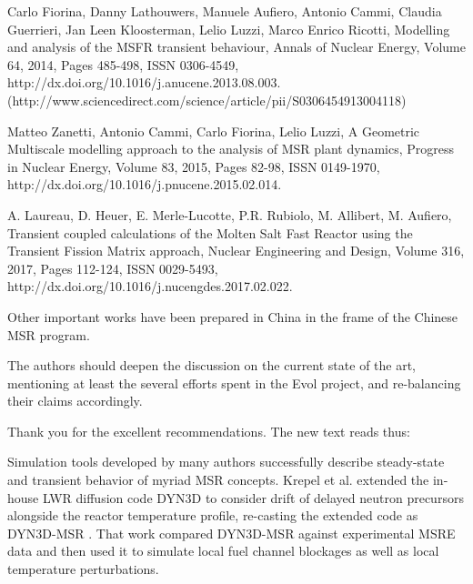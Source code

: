 \documentclass[answers,11pt]{exam}
\begin{document}
\begin{questions}
Carlo Fiorina, Danny Lathouwers, Manuele Aufiero, Antonio Cammi, Claudia
Guerrieri, Jan Leen Kloosterman, Lelio Luzzi, Marco Enrico Ricotti, Modelling
and analysis of the MSFR transient behaviour, Annals of Nuclear Energy, Volume
64, 2014, Pages 485-498, ISSN 0306-4549,
http://dx.doi.org/10.1016/j.anucene.2013.08.003.
(http://www.sciencedirect.com/science/article/pii/S0306454913004118)

Matteo Zanetti, Antonio Cammi, Carlo Fiorina, Lelio Luzzi, A Geometric
Multiscale modelling approach to the analysis of MSR plant dynamics, Progress in
Nuclear Energy, Volume 83, 2015, Pages 82-98, ISSN 0149-1970,
http://dx.doi.org/10.1016/j.pnucene.2015.02.014.

A. Laureau, D. Heuer, E. Merle-Lucotte, P.R. Rubiolo, M. Allibert, M. Aufiero,
Transient coupled calculations of the Molten Salt Fast Reactor using the
Transient Fission Matrix approach, Nuclear Engineering and Design, Volume 316,
2017, Pages 112-124, ISSN 0029-5493,
http://dx.doi.org/10.1016/j.nucengdes.2017.02.022.

Other important works have been prepared in China in the frame of the Chinese MSR program.

The authors should deepen the discussion on the current state of the art,
mentioning at least the several efforts spent in the Evol project, and
re-balancing their claims accordingly.
\begin{solution}
        Thank you for the excellent recommendations. The new text reads thus:


        Simulation tools developed by many authors successfully describe
        steady-state and
        transient behavior of myriad MSR concepts. Krepel et al. extended
        the in-house LWR
        diffusion code DYN3D to consider drift of delayed neutron precursors
        alongside
        the reactor temperature profile, re-casting the extended code as
        DYN3D-MSR \cite{krepel_dyn3d-msr_2007}. That work compared DYN3D-MSR
        against
        experimental MSRE data and then used it to simulate local fuel
        channel
        blockages as well as local temperature perturbations.


\end{solution}
\end{questions}
\end{document}
